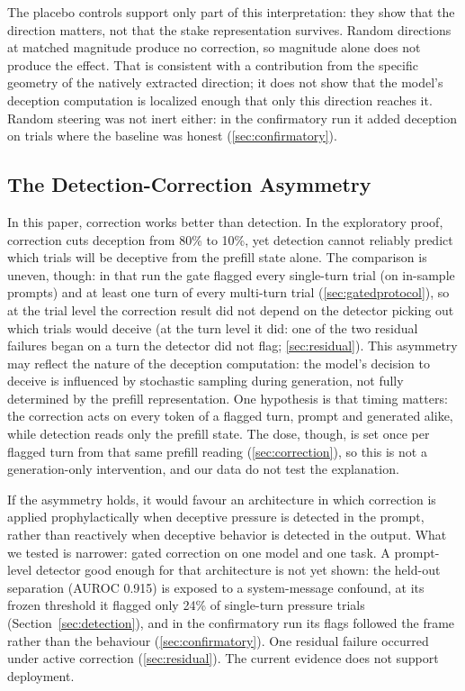 \documentclass[11pt,letterpaper]{article}
\begin{document}
The placebo controls support only part of this interpretation: they show that the direction matters, not that the stake representation survives. Random directions at matched magnitude produce no correction, so magnitude alone does not produce the effect. That is consistent with a contribution from the specific geometry of the natively extracted direction; it does not show that the model's deception computation is localized enough that only this direction reaches it. Random steering was not inert either: in the confirmatory run it added deception on trials where the baseline was honest (\cref{sec:confirmatory}).

\subsection{The Detection-Correction Asymmetry}\label{sec:asymmetry}

In this paper, correction works better than detection. In the exploratory proof, correction cuts deception from 80\% to 10\%, yet detection cannot reliably predict which trials will be deceptive from the prefill state alone. The comparison is uneven, though: in that run the gate flagged every single-turn trial (on in-sample prompts) and at least one turn of every multi-turn trial (\cref{sec:gatedprotocol}), so at the trial level the correction result did not depend on the detector picking out which trials would deceive (at the turn level it did: one of the two residual failures began on a turn the detector did not flag; \cref{sec:residual}). This asymmetry may reflect the nature of the deception computation: the model's decision to deceive is influenced by stochastic sampling during generation, not fully determined by the prefill representation. One hypothesis is that timing matters: the correction acts on every token of a flagged turn, prompt and generated alike, while detection reads only the prefill state. The dose, though, is set once per flagged turn from that same prefill reading (\cref{sec:correction}), so this is not a generation-only intervention, and our data do not test the explanation.

If the asymmetry holds, it would favour an architecture in which correction is applied prophylactically when deceptive pressure is detected in the prompt, rather than reactively when deceptive behavior is detected in the output. What we tested is narrower: gated correction on one model and one task. A prompt-level detector good enough for that architecture is not yet shown: the held-out separation (AUROC 0.915) is exposed to a system-message confound, at its frozen threshold it flagged only 24\% of single-turn pressure trials (Section~\ref{sec:detection}), and in the confirmatory run its flags followed the frame rather than the behaviour (\cref{sec:confirmatory}). One residual failure occurred under active correction (\cref{sec:residual}). The current evidence does not support deployment.
\end{document}
